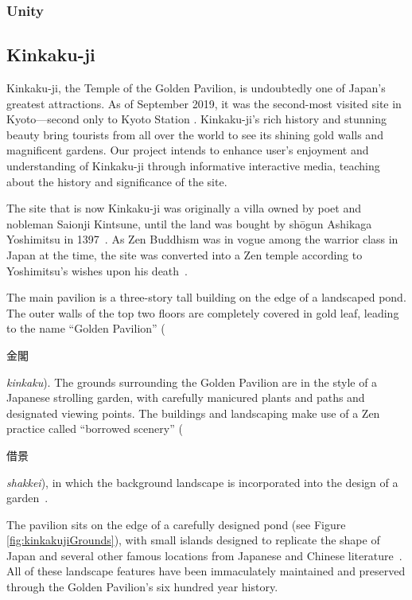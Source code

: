 \documentclass[a4paper, 10pt, american, titlepage]{article}
\begin{document}
\subsubsection{Unity}
\label{sec:unity}

\subsection{Kinkaku-ji}
\label{sec:kinkaku-ji}

Kinkaku-ji, the Temple of the Golden Pavilion, is undoubtedly one of Japan's
greatest attractions.  As of September 2019, it was the second-most visited site
in Kyoto---second only to Kyoto Station \autocite{japanguide2019}. Kinkaku-ji's
rich history and stunning beauty bring tourists from all over the world to see
its shining gold walls and magnificent gardens. Our project intends to enhance
user's enjoyment and understanding of Kinkaku-ji through informative interactive
media, teaching about the history and significance of the site.

The site that is now Kinkaku-ji was originally a villa owned by poet and
nobleman Saionji Kintsune, until the land was bought by shōgun Ashikaga
Yoshimitsu in 1397~\autocite{noboru2013}. As Zen Buddhism was in vogue among the
warrior class in Japan at the time, the site was converted into a Zen temple
according to Yoshimitsu's wishes upon his death~\autocite{bornoff2000}.

The main pavilion is a three-story tall building on the edge of a landscaped
pond. The outer walls of the top two floors are completely covered in gold leaf,
leading to the name ``Golden Pavilion'' (\begin{CJK}{UTF8}{min}金閣\end{CJK}
\textit{kinkaku}). The grounds surrounding the Golden Pavilion are in the style
of a Japanese strolling garden, with carefully manicured plants and paths and
designated viewing points. The buildings and landscaping make use of a Zen
practice called ``borrowed scenery'' (\begin{CJK}{UTF8}{min}借景\end{CJK}
\textit{shakkei}), in which the background landscape is incorporated into the
design of a garden~\autocite{noboru2013}.

The pavilion sits on the edge of a carefully designed pond (see Figure
\ref{fig:kinkakujiGrounds}), with small islands designed to replicate the shape
of Japan and several other famous locations from Japanese and Chinese
literature~\autocite{young2007}. All of these landscape features have been
immaculately maintained and preserved through the Golden Pavilion's six hundred
year history.
\end{document}
